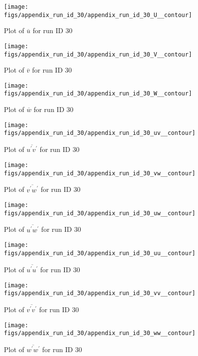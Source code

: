 \begin{figure}[H]
\centering
\texttt{[image: figs/appendix\_run\_id\_30/appendix\_run\_id\_30\_U\_\_contour]}
\caption{Plot of $\overline{u}$ for run ID 30}
\label{fig:appendix_run_id_30_U__contour}
\end{figure}


\begin{figure}[H]
\centering
\texttt{[image: figs/appendix\_run\_id\_30/appendix\_run\_id\_30\_V\_\_contour]}
\caption{Plot of $\overline{v}$ for run ID 30}
\label{fig:appendix_run_id_30_V__contour}
\end{figure}


\begin{figure}[H]
\centering
\texttt{[image: figs/appendix\_run\_id\_30/appendix\_run\_id\_30\_W\_\_contour]}
\caption{Plot of $\overline{w}$ for run ID 30}
\label{fig:appendix_run_id_30_W__contour}
\end{figure}


\begin{figure}[H]
\centering
\texttt{[image: figs/appendix\_run\_id\_30/appendix\_run\_id\_30\_uv\_\_contour]}
\caption{Plot of $\overline{u^\prime v^\prime}$ for run ID 30}
\label{fig:appendix_run_id_30_uv__contour}
\end{figure}


\begin{figure}[H]
\centering
\texttt{[image: figs/appendix\_run\_id\_30/appendix\_run\_id\_30\_vw\_\_contour]}
\caption{Plot of $\overline{v^\prime w^\prime}$ for run ID 30}
\label{fig:appendix_run_id_30_vw__contour}
\end{figure}


\begin{figure}[H]
\centering
\texttt{[image: figs/appendix\_run\_id\_30/appendix\_run\_id\_30\_uw\_\_contour]}
\caption{Plot of $\overline{u^\prime w^\prime}$ for run ID 30}
\label{fig:appendix_run_id_30_uw__contour}
\end{figure}


\begin{figure}[H]
\centering
\texttt{[image: figs/appendix\_run\_id\_30/appendix\_run\_id\_30\_uu\_\_contour]}
\caption{Plot of $\overline{u^\prime u^\prime}$ for run ID 30}
\label{fig:appendix_run_id_30_uu__contour}
\end{figure}


\begin{figure}[H]
\centering
\texttt{[image: figs/appendix\_run\_id\_30/appendix\_run\_id\_30\_vv\_\_contour]}
\caption{Plot of $\overline{v^\prime v^\prime}$ for run ID 30}
\label{fig:appendix_run_id_30_vv__contour}
\end{figure}


\begin{figure}[H]
\centering
\texttt{[image: figs/appendix\_run\_id\_30/appendix\_run\_id\_30\_ww\_\_contour]}
\caption{Plot of $\overline{w^\prime w^\prime}$ for run ID 30}
\label{fig:appendix_run_id_30_ww__contour}
\end{figure}


